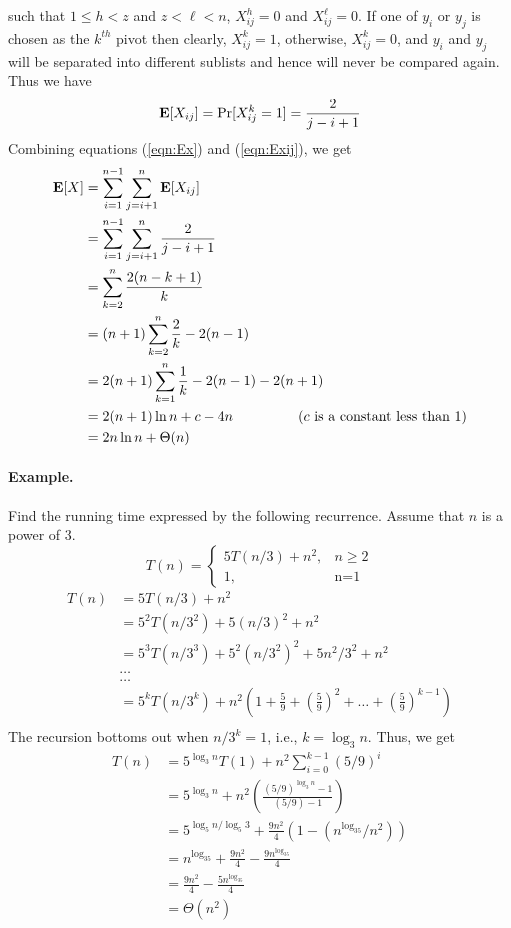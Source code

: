 \documentclass[11pt,twoside]{article}
\newcommand{\E}{{\mbox {\bf E}}}
\begin{document}
such that  $1\leq h < z$ and $z< \ell <n$, $X_{ij}^h=0$ and
$X_{ij}^{\ell}=0$. If one of $y_i$ or $y_j$ is chosen as the $k^{th}$
pivot then clearly, $X_{ij}^{k}=1$, otherwise, $X_{ij}^{k}=0$, and
$y_i$ and $y_j$ will be separated into different sublists and hence will
never be compared again.  Thus we have
\begin{equation}
\label{eqn:Exij}
\E[X_{ij}] = \Pr[X_{ij}^{k}=1] = \frac{2}{j-i+1}
\end{equation}
Combining equations (\ref{eqn:Ex}) and (\ref{eqn:Exij}), we get
\begin{align*}
\E[X] &= \sum_{i=1}^{n-1}\sum_{j=i+1}^{n}\E[X_{ij}] \\
      &= \sum_{i=1}^{n-1}\sum_{j=i+1}^{n}\frac{2}{j-i+1} \\
      &= \sum_{k=2}^{n}\frac{2(n-k+1)}{k} \\
      &= (n+1)\sum_{k=2}^{n}\frac{2}{k} - 2(n-1)  \\
      &= 2(n+1)\sum_{k=1}^{n}\frac{1}{k} - 2(n-1)-2(n+1) \\
      &= 2(n+1)\ln n + c - 4n  \mbox{~~~~~~~~~~~~~~($c$ is a constant less than 1)}\\
      &= 2n\ln n + \Theta(n)
\end{align*}


\paragraph{Example.} Find the running time expressed by the following
recurrence. Assume that $n$ is a power of 3.
\[
T(n) = \left\{ \begin{array}{ll}
      5T(n/3) + n^2, &  n \geq 2 \\
      1, & \mbox{n=1}
      \end{array} \right.
\]
\begin{align*}
T(n) & =  5T(n/3) + n^2 \\
& =  5^2T(n/3^2) + 5(n/3)^2 + n^2 \\
& = 5^3T(n/3^3) + 5^2(n/3^2)^2 + 5n^2/3^2 + n^2 \\
&  \ldots \\
&  \ldots \\
& = 5^kT(n/3^k) + n^2\left (1 + \frac{5}{9} + \left (\frac{5}{9}\right
)^2 +\ldots + \left(\frac{5}{9} \right )^{k-1}\right ) \\
\end{align*}
\noindent
The recursion bottoms out when $n/3^k = 1$, i.e., $k=\log_3 n$. Thus, we get
\begin{align*}
T(n) & =  5^{\log_3n}T(1) + n^2\sum_{i=0}^{k-1}(5/9)^i \\
     & = 5^{\log_3n} + n^2\left (\frac{(5/9)^{\log_3 n}-1}{(5/9) -1} \right ) \\
     & = 5^{\log_5 n/\log_5 3} + \frac{9n^2}{4}\left (1 - (n^{\log_35}/n^2) \right ) \\
     & = n^{\log_35} + \frac{9n^2}{4} - \frac{9n^{\log_35}}{4} \\
     & = \frac{9n^2}{4} - \frac{5n^{\log_35}}{4} \\
     & = \Theta(n^2)
\end{align*}
\end{document}
